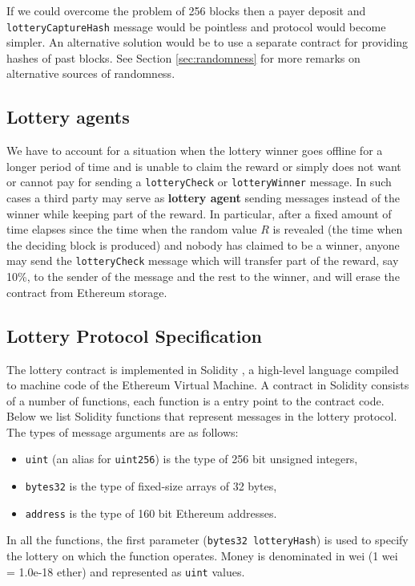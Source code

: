 \documentclass[a4paper]{article}
\begin{document}
    If we could overcome the problem of 256 blocks then a payer deposit and \texttt{lotteryCaptureHash} message would
    be pointless and protocol would become simpler. An alternative solution would be to use a separate contract
    for providing hashes of past blocks. See Section \ref{sec:randomness} for more remarks on alternative sources
    of randomness.
\subsection{Lottery agents}
    We have to account for a situation when the lottery winner goes offline for a longer period of time and is
    unable to claim the reward or simply does not want or cannot pay for sending a \texttt{lotteryCheck} or
    \texttt{lotteryWinner} message. In such cases a third party may serve as \textbf{lottery agent} sending messages
    instead of the winner while keeping part of the reward. In particular, after a fixed amount of time elapses
    since the time when the random value $R$ is revealed (the time when the deciding block is produced) and nobody has
    claimed to be a winner, anyone may send the \texttt{lotteryCheck} message which will transfer part of the reward,
    say 10\%, to the sender of the message and the rest to the winner, and will erase the contract from Ethereum
    storage.
\subsection{Lottery Protocol Specification}
    The lottery contract is implemented in Solidity \cite{SOLIDITY}, a high-level language compiled to machine code of
    the Ethereum Virtual Machine\cite{ETHERDEV}. A contract in Solidity consists of a number of functions, each
    function is a entry point to the contract code. Below we list Solidity functions that represent messages in the
    lottery protocol. The types of message arguments are as follows:
    \begin{itemize}
        \item \texttt{uint} (an alias for \texttt{uint256}) is the type of 256 bit unsigned integers,
        \item \texttt{bytes32} is the type of fixed-size arrays of 32 bytes,
        \item \texttt{address} is the type of 160 bit Ethereum addresses.
    \end{itemize}
    In all the functions, the first parameter (\texttt{bytes32 lotteryHash}) is used to specify the lottery on which
    the function operates. Money is denominated in wei (1 wei = 1.0e-18 ether) and represented as \texttt{uint} values.
\end{document}
